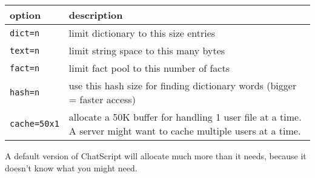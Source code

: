 \documentclass[]{article}
\begin{document}
\begin{longtable}[]{@{}ll@{}}
\toprule
\begin{minipage}[b]{0.16\columnwidth}\raggedright\strut
option\strut
\end{minipage} & \begin{minipage}[b]{0.78\columnwidth}\raggedright\strut
description\strut
\end{minipage}\tabularnewline
\midrule
\endhead
\begin{minipage}[t]{0.16\columnwidth}\raggedright\strut
\texttt{dict=n}\strut
\end{minipage} & \begin{minipage}[t]{0.78\columnwidth}\raggedright\strut
limit dictionary to this size entries\strut
\end{minipage}\tabularnewline
\begin{minipage}[t]{0.16\columnwidth}\raggedright\strut
\texttt{text=n}\strut
\end{minipage} & \begin{minipage}[t]{0.78\columnwidth}\raggedright\strut
limit string space to this many bytes\strut
\end{minipage}\tabularnewline
\begin{minipage}[t]{0.16\columnwidth}\raggedright\strut
\texttt{fact=n}\strut
\end{minipage} & \begin{minipage}[t]{0.78\columnwidth}\raggedright\strut
limit fact pool to this number of facts\strut
\end{minipage}\tabularnewline
\begin{minipage}[t]{0.16\columnwidth}\raggedright\strut
\texttt{hash=n}\strut
\end{minipage} & \begin{minipage}[t]{0.78\columnwidth}\raggedright\strut
use this hash size for finding dictionary words (bigger = faster
access)\strut
\end{minipage}\tabularnewline
\begin{minipage}[t]{0.16\columnwidth}\raggedright\strut
\texttt{cache=50x1}\strut
\end{minipage} & \begin{minipage}[t]{0.78\columnwidth}\raggedright\strut
allocate a 50K buffer for handling 1 user file at a time. A server might
want to cache multiple users at a time.\strut
\end{minipage}\tabularnewline
\bottomrule
\end{longtable}

A default version of ChatScript will allocate much more than it needs,
because it doesn't know what you might need.
\end{document}
